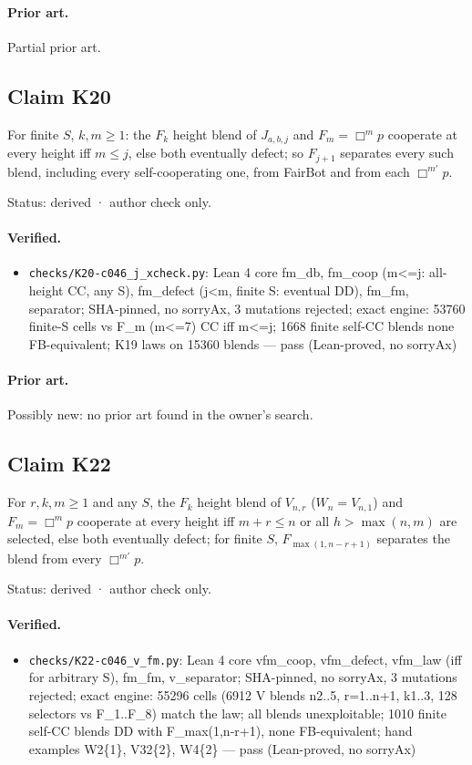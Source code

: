 \documentclass{article}
\begin{document}
\paragraph{Prior art.} Partial prior art.

\subsection*{Claim K20}

For finite $S$, $k,m\ge1$: the $F_k$ height blend of $J_{a,b,j}$ and $F_m=\Box^m p$ cooperate at every height iff $m\le j$, else both eventually defect; so $F_{j+1}$ separates every such blend, including every self-cooperating one, from FairBot and from each $\Box^{m'}p$.

Status: derived · author check only.

\paragraph{Verified.}
\begin{itemize}
\item \texttt{checks/K20-c046\_j\_xcheck.py}: Lean 4 core fm\_db, fm\_coop (m\textless{}=j: all-height CC, any S), fm\_defect (j\textless{}m, finite S: eventual DD), fm\_fm, separator; SHA-pinned, no sorryAx, 3 mutations rejected; exact engine: 53760 finite-S cells vs F\_m (m\textless{}=7) CC iff m\textless{}=j; 1668 finite self-CC blends none FB-equivalent; K19 laws on 15360 blends --- pass (Lean-proved, no sorryAx)
\end{itemize}

\paragraph{Prior art.} Possibly new: no prior art found in the owner's search.

\subsection*{Claim K22}

For $r,k,m\ge1$ and any $S$, the $F_k$ height blend of $V_{n,r}$ ($W_n=V_{n,1}$) and $F_m=\Box^mp$ cooperate at every height iff $m+r\le n$ or all $h>\max(n,m)$ are selected, else both eventually defect; for finite $S$, $F_{\max(1,n-r+1)}$ separates the blend from every $\Box^{m'}p$.

Status: derived · author check only.

\paragraph{Verified.}
\begin{itemize}
\item \texttt{checks/K22-c046\_v\_fm.py}: Lean 4 core vfm\_coop, vfm\_defect, vfm\_law (iff for arbitrary S), fm\_fm, v\_separator; SHA-pinned, no sorryAx, 3 mutations rejected; exact engine: 55296 cells (6912 V blends n2..5, r=1..n+1, k1..3, 128 selectors vs F\_1..F\_8) match the law; all blends unexploitable; 1010 finite self-CC blends DD with F\_max(1,n-r+1), none FB-equivalent; hand examples W2\{1\}, V32\{2\}, W4\{2\} --- pass (Lean-proved, no sorryAx)
\end{itemize}
\end{document}

